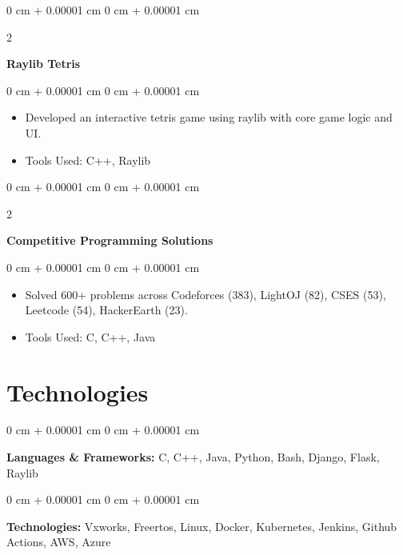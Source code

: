 \documentclass[10pt, letterpaper]{article}
\newenvironment{highlights}{
	\begin{itemize}[
		topsep=0.10 cm,
		parsep=0.10 cm,
		partopsep=0pt,
		itemsep=0pt,
		leftmargin=0 cm + 10pt
		]
	}{
	\end{itemize}
} %
\newenvironment{onecolentry}{
	\begin{adjustwidth}{
			0 cm + 0.00001 cm
		}{
			0 cm + 0.00001 cm
		}
	}{
	\end{adjustwidth}
} %
\newenvironment{twocolentry}[2][]{
	\onecolentry
	\def\secondColumn{#2}
	\setcolumnwidth{\fill, 4.5 cm}
	\begin{paracol}{2}
	}{
		\switchcolumn \raggedleft \secondColumn
	\end{paracol}
	\endonecolentry
} %
\begin{document}
	
	\vspace{0.2 cm}
	
	\begin{twocolentry}{
			\href{https://github.com/sudiptarathi2020/raylib-Tetris}{{\faGithub}}
		}
		\textbf{Raylib Tetris}\end{twocolentry}
	
	\vspace{0.10 cm}
	\begin{onecolentry}
		\begin{highlights}
			\item Developed an interactive tetris game using raylib with core game logic and UI.
			\item Tools Used: C++, Raylib
		\end{highlights}
	\end{onecolentry}
	
	\vspace{0.2cm}
	\begin{twocolentry}
		{
			\href{https://github.com/sudiptarathi2020/Data-structures-and-Algorithms}{{\faGithub}}
		}
		
		\textbf{Competitive Programming Solutions}
	\end{twocolentry}
	\vspace{0.10cm}
	\begin{onecolentry}
		\begin{highlights}
			\item Solved 600+ problems across Codeforces (383), LightOJ (82), CSES (53), Leetcode (54), HackerEarth (23).
			\item Tools Used: C, C++, Java
		\end{highlights}
	\end{onecolentry}
	
	\section{Technologies}

	\begin{onecolentry}
		\textbf{Languages \& Frameworks:} C, C++, Java, Python, Bash, Django, Flask, Raylib
	\end{onecolentry}
	
	\vspace{0.2 cm}
	
	\begin{onecolentry}
		\textbf{Technologies:} Vxworks, Freertos, Linux, Docker, Kubernetes, Jenkins, Github Actions, AWS, Azure
	\end{onecolentry}
	
	
	
\end{document}
